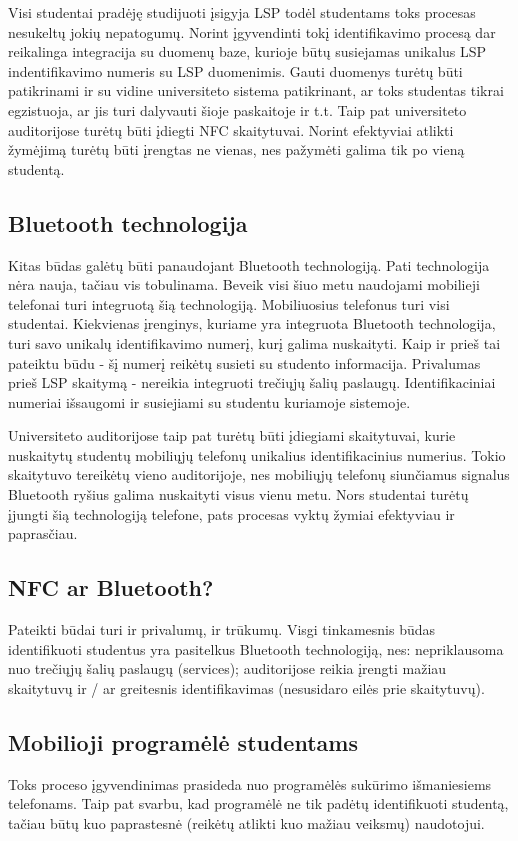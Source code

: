 \documentclass{VUMIFPSkursinis}
\begin{document}
Visi studentai pradėję studijuoti įsigyja LSP todėl studentams toks procesas nesukeltų jokių nepatogumų. Norint įgyvendinti tokį identifikavimo procesą dar reikalinga integracija su duomenų baze, kurioje būtų susiejamas unikalus LSP indentifikavimo numeris su LSP duomenimis. Gauti duomenys turėtų būti patikrinami ir su vidine universiteto sistema patikrinant, ar toks studentas tikrai egzistuoja, ar jis turi dalyvauti šioje paskaitoje ir t.t. Taip pat universiteto auditorijose turėtų būti įdiegti NFC skaitytuvai. Norint efektyviai atlikti žymėjimą turėtų būti įrengtas ne vienas, nes pažymėti galima tik po vieną studentą.

\subsection{Bluetooth technologija}
Kitas būdas galėtų būti panaudojant Bluetooth technologiją. Pati technologija nėra nauja, tačiau vis tobulinama. Beveik visi šiuo metu naudojami mobilieji telefonai turi integruotą šią technologiją. Mobiliuosius telefonus turi visi studentai. Kiekvienas įrenginys, kuriame yra integruota Bluetooth technologija, turi savo unikalų identifikavimo numerį, kurį galima nuskaityti. Kaip ir prieš tai pateiktu būdu - šį numerį reikėtų susieti su studento informacija. Privalumas prieš LSP skaitymą - nereikia integruoti trečiųjų šalių paslaugų. Identifikaciniai numeriai išsaugomi ir susiejiami su studentu kuriamoje sistemoje.

Universiteto auditorijose taip pat turėtų būti įdiegiami skaitytuvai, kurie nuskaitytų studentų mobiliųjų telefonų unikalius identifikacinius numerius. Tokio skaitytuvo tereikėtų vieno auditorijoje, nes mobiliųjų telefonų siunčiamus signalus Bluetooth ryšius galima nuskaityti visus vienu metu. Nors studentai turėtų įjungti šią technologiją telefone, pats procesas vyktų žymiai efektyviau ir paprasčiau.

\subsection{NFC ar Bluetooth?}
Pateikti būdai turi ir privalumų, ir trūkumų. Visgi tinkamesnis būdas identifikuoti studentus yra pasitelkus Bluetooth technologiją, nes: nepriklausoma nuo trečiųjų šalių paslaugų (services); auditorijose reikia įrengti mažiau skaitytuvų ir / ar greitesnis identifikavimas (nesusidaro eilės prie skaitytuvų).

\subsection{Mobilioji programėlė studentams}
Toks proceso įgyvendinimas prasideda nuo programėlės sukūrimo išmaniesiems telefonams. Taip pat svarbu, kad programėlė ne tik padėtų identifikuoti studentą, tačiau būtų kuo paprastesnė (reikėtų atlikti kuo mažiau veiksmų) naudotojui.
\end{document}
